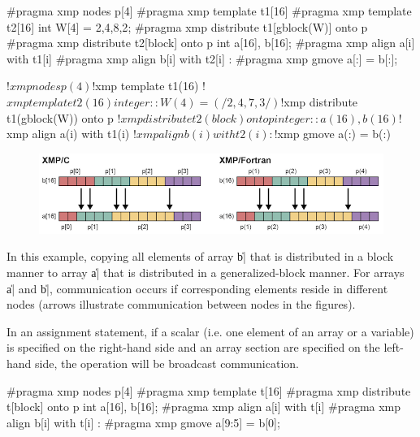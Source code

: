 \begin{XCexample}
#pragma xmp nodes p[4]
#pragma xmp template t1[16]
#pragma xmp template t2[16]
int W[4] = {2,4,8,2};
#pragma xmp distribute t1[gblock(W)] onto p
#pragma xmp distribute t2[block] onto p
int a[16], b[16];
#pragma xmp align a[i] with t1[i]
#pragma xmp align b[i] with t2[i]
     :
#pragma xmp gmove
  a[:] = b[:];
\end{XCexample}

\begin{XFexample}
!$xmp nodes p(4)
!$xmp template t1(16)
!$xmp template t2(16)
integer :: W(4) = (/2,4,7,3/)
!$xmp distribute t1(gblock(W)) onto p
!$xmp distribute t2(block) onto p
integer :: a(16), b(16)
!$xmp align a(i) with t1(i)
!$xmp align b(i) with t2(i)
     :
!$xmp gmove
  a(:) = b(:)
\end{XFexample}

\begin{figure}
  \centering
  \includegraphics[width=\textwidth]{figs/gmove_change.png}
\end{figure}

In this example, copying all elements of array \|b| that is distributed in
a block manner to array \|a| that is distributed in a generalized-block
manner.
%
For arrays \|a| and \|b|, communication occurs if corresponding elements
reside in different nodes (arrows illustrate communication between nodes in
the figures).


In an assignment statement, if a scalar (i.e. one element of an array or
a variable) is specified on the right-hand side and an array section are
specified on the left-hand side, the operation will be broadcast
communication.

\begin{XCexample}
#pragma xmp nodes p[4]
#pragma xmp template t[16]
#pragma xmp distribute t[block] onto p
int a[16], b[16];
#pragma xmp align a[i] with t[i]
#pragma xmp align b[i] with t[i]
     :
#pragma xmp gmove
  a[9:5] = b[0];
\end{XCexample}

